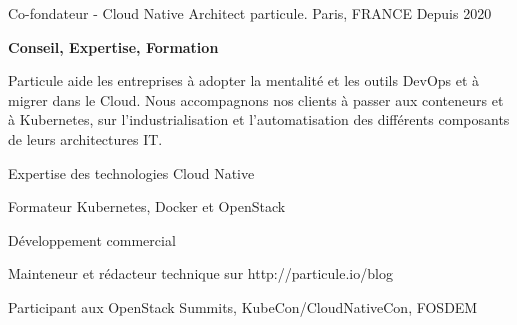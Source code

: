 

\begin{cventries}

\cventry
    {Co-fondateur - Cloud Native Architect} %
    {particule.} %
    {Paris, FRANCE} %
    {Depuis 2020} %
    {
      \begin{cvitems} %
      \item {\textbf{Conseil, Expertise, Formation}}
      \item {Particule aide les entreprises à adopter la mentalité et les outils DevOps
        et à migrer dans le Cloud. Nous accompagnons nos clients à passer aux
          conteneurs et à Kubernetes, sur l'industrialisation et
          l'automatisation des différents composants de leurs architectures IT.}
        \item {Expertise des technologies Cloud Native}
        \item {Formateur Kubernetes, Docker et OpenStack}
        \item {Développement commercial}
        \item {Mainteneur et rédacteur technique sur http://particule.io/blog}
        \item {Participant aux OpenStack Summits, KubeCon/CloudNativeCon, FOSDEM}
      \end{cvitems}
    }


\end{cventries}
